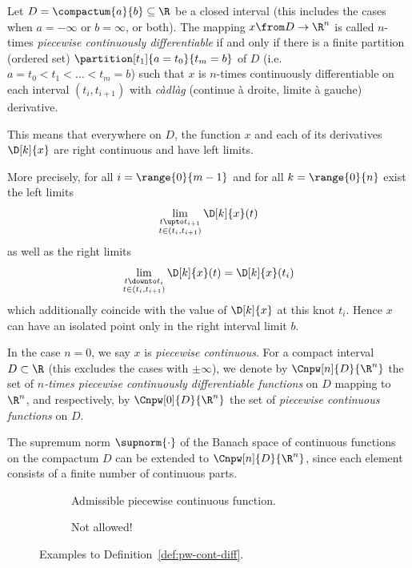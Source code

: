     \begin{definition}
    \label{def:pw-cont-diff}
        Let $D=\compactum{a}{b}\subseteq\R$ be a closed interval (this includes the cases when $a=-\infty$ or $b=\infty$, or both). The mapping $x\from D\to\R^n$ is called $n$-times \emph{piecewise continuously differentiable} if and only if there is a finite partition (ordered set) $\partition[t_1]{a=t_0}{t_m=b}$ of $D$ (i.e.\ $a=t_0<t_1<\ldots<t_m=b$) such that $x$ is $n$-times continuously differentiable on each interval $(t_i,t_{i+1})$ with \foreignlanguage{frenchb}{\emph{càdlàg} (\og continue à droite, limite à gauche\fg{})} derivative.

        This means that everywhere on $D$, the function $x$ and each of its derivatives $\D[k]{x}$ are right continuous and have left limits.

        More precisely, for all $i=\range{0}{m-1}$ and for all $k=\range{0}{n}$ exist the left limits
        \begin{equation*}
            \lim_{\substack{t\upto t_{i+1}\\ t\in(t_i,t_{i+1})}} \D[k]{x}(t)
        \end{equation*}
        as well as the right limits
        \begin{equation*}
            \lim_{\substack{t\downto t_{i}\\ t\in(t_i,t_{i+1})}} \D[k]{x}(t) = \D[k]{x}(t_i)
        \end{equation*}
        which additionally coincide with the value of $\D[k]{x}$ at this knot $t_i$.
        Hence $x$ can have an isolated point only in the right interval limit $b$.

        In the case $n=0$, we say $x$ is \emph{piecewise continuous}.
        For a compact interval $D\subset\R$ (this excludes the cases with $\pm\infty$), we denote by $\Cnpw[n]{D}{\R^n}$ the set of \emph{$n$-times piecewise continuously differentiable functions} on $D$ mapping to $\R^n$, and respectively, by $\Cnpw[0]{D}{\R^n}$ the set of \emph{piecewise continuous functions} on $D$.

        The supremum norm $\supnorm{\cdot}$ of the Banach space of continuous functions on the compactum $D$ can be extended to $\Cnpw[n]{D}{\R^n}$, since each element consists of a finite number of continuous parts.
    \end{definition}

    \begin{figure}[t]\centering
        \begin{subfigure}[t]{0.48\textwidth}
            \centering
            
            \caption{Admissible piecewise continuous function.}
            \label{fig:allowed}
        \end{subfigure}
        \hfill
        \begin{subfigure}[t]{0.48\textwidth}
            \centering
            
            \caption{Not allowed!}
            \label{fig:not-allowed}
        \end{subfigure}
        \caption{Examples to Definition~\ref{def:pw-cont-diff}.}
    \end{figure}

